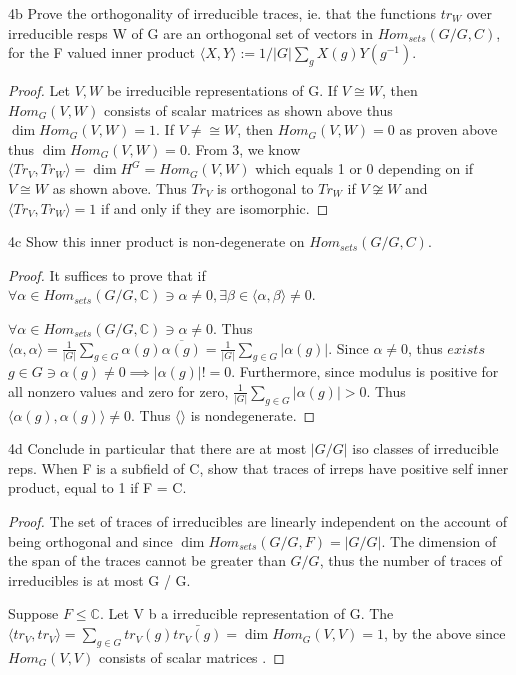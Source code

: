 \documentclass{article}
\newcommand{\C}{\mathbb{C}}
\newcommand{\abs}[1]{\lvert #1\rvert}
\newcommand{\angles}[1]{\langle #1 \rangle}
\begin{document}
\begin{claim}{4b}\label{Claim 4b.}
    Prove the orthogonality of irreducible traces, ie. that the functions $tr_W$ over irreducible resps W of G are an orthogonal set of vectors in $Hom_{sets}(G/G,C)$, for the F valued inner product $\angles{X,Y} := 1/|G| \sum_g X(g) Y(g^{-1})$.
\end{claim}
\begin{proof}
    Let $V, W$ be irreducible representations of G. If $V \cong W$, then $Hom_G(V, W)$ consists of scalar matrices as shown above thus $\dim Hom_G(V, W) = 1$. If $V \neq \cong W$, then $Hom_G(V, W) = 0$ as proven above thus $\dim Hom_G(V, W) = 0$. From 3, we know $\angles{Tr_V, Tr_W} = \dim H^G = Hom_G(V, W)$ which equals 1 or 0 depending on if $V \cong W$ as shown above. Thus $Tr_V$ is orthogonal to $Tr_W$ if $V \not \cong W$ and $\angles{Tr_V, Tr_W} = 1$ if and only if they are isomorphic.        
\end{proof}
\begin{claim}{4c}\label{Claim 4c.}
    Show this inner product is non-degenerate on $Hom_{sets}(G/G,C)$.
\end{claim}
\begin{proof}
    It suffices to prove that if $\forall \alpha \in Hom_{sets}(G / G, \C) \ni \alpha \neq 0, \exists \beta \in \angles{\alpha, \beta} \neq 0$.

    $\forall \alpha \in Hom_{sets}(G / G, \C) \ni \alpha \neq 0$. Thus $\angles{\alpha, \alpha} = \frac{1}{|G|} \sum_{g \in G} \alpha(g) \overline{\alpha(g)} = \frac{1}{|G|} \sum_{g \in G} \abs{\alpha(g)}$. Since $\alpha \neq 0$, thus $exists$ $g \in G \ni \alpha(g) \neq 0 \implies |\alpha(g)| != 0$. Furthermore, since modulus is positive for all nonzero values and zero for zero, $\frac{1}{|G|} \sum_{g \in G} \abs{\alpha(g)} > 0$. Thus $\angles{\alpha(g), \alpha(g)} \neq 0$. Thus $\angles{}$ is nondegenerate.         
\end{proof}

\begin{PROB}{4d}\label{Problem 4d.}
    Conclude in particular that there are at most $|G/G|$ iso classes of irreducible reps. When F is a subfield of C, show that traces of irreps have positive self inner product, equal to 1 if F = C.
\end{PROB}
\begin{proof}
    The set of traces of irreducibles are linearly independent on the account of being orthogonal and since $\dim Hom_{sets}(G / G, F) = |G / G|$. The dimension of the span of the traces cannot be greater than $G / G$, thus the number of traces of irreducibles is at most G / G.
    
    Suppose $F \leq \C$. Let V b a irreducible representation of G. The $\angles{tr_V, tr_V} = \sum_{g \in G} tr_V(g) \bar{tr_V(g)} = \dim Hom_{G}(V, V) = 1$, by the above since $Hom_{G}(V, V)$  consists of scalar matrices .
\end{proof}
\end{document}
